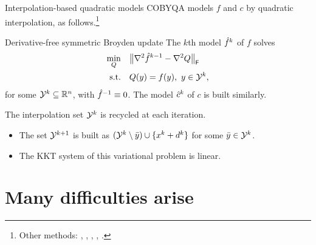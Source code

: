 \documentclass[
]{presentation}
\newcommand{\obj}{f}
\newcommand{\objm}[1][]{\hat{f}\ifblank{#1}{}{^{#1}}}
\newcommand{\con}{c}
\newcommand{\conm}[1][]{\hat{c}\ifblank{#1}{}{^{#1}}}
\newcommand{\iter}[1][]{x\ifblank{#1}{}{^{#1}}}
\newcommand{\step}[1][]{d\ifblank{#1}{}{^{#1}}}
\newcommand{\xpt}[1][]{\mathcal{Y}\ifblank{#1}{}{^{#1}}}
\begin{document}
\begin{frame}{Interpolation-based quadratic models}
    COBYQA models $\obj$ and $\con$ by \alert{quadratic} interpolation, as follows.\footnote{Other methods: \textcite{Conn_Scheinberg_Toint_1997a,Conn_Scheinberg_Toint_1997b,Conn_Scheinberg_Toint_1998}, \textcite{Wild_2008}, \textcite{Bandeira_Scheinberg_Vicente_2012}, \textcite{Zhang_2014}, \textcite{Xie_Yuan_2023}.}

    \begin{block}{Derivative-free symmetric Broyden update \parencite{Powell_2004b}}
        The $k$th model $\objm[k]$ of $\obj$ solves
        \begin{align*}
            \min_Q          & \quad \norm[\big]{\nabla^2 \objm[k - 1] - \nabla^2 Q}_{\mathsf{F}}\\
            \textrm{s.t.}   & \quad Q(y) = \obj(y), ~ y \in \xpt[k],
        \end{align*}
        for some $\xpt[k] \subseteq \R^n$, with $\objm[-1] \equiv 0$.
        The model $\conm[k]$ of $\con$ is built similarly.
    \end{block}

    \vspace{-0.25\baselineskip}
    The interpolation set $\xpt[k]$ is \alert{recycled} at each iteration.
    \begin{itemize}
        \item The set $\xpt[k + 1]$ is built as $(\xpt[k] \setminus {\bar{y}}) \cup \set{\iter[k] + \step[k]}$ for some $\bar{y} \in \xpt[k]$.
        \item The KKT system of this variational problem is \alert{linear}.
    \end{itemize}
\end{frame}

\section{Many difficulties arise}
\end{document}
